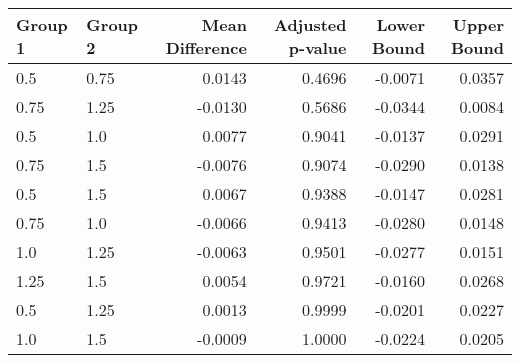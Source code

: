 \begin{tabular}{llrrrr}
\toprule
Group 1 & Group 2 & Mean Difference & Adjusted p-value & Lower Bound & Upper Bound \\
\midrule
0.5 & 0.75 & 0.0143 & 0.4696 & -0.0071 & 0.0357 \\
0.75 & 1.25 & -0.0130 & 0.5686 & -0.0344 & 0.0084 \\
0.5 & 1.0 & 0.0077 & 0.9041 & -0.0137 & 0.0291 \\
0.75 & 1.5 & -0.0076 & 0.9074 & -0.0290 & 0.0138 \\
0.5 & 1.5 & 0.0067 & 0.9388 & -0.0147 & 0.0281 \\
0.75 & 1.0 & -0.0066 & 0.9413 & -0.0280 & 0.0148 \\
1.0 & 1.25 & -0.0063 & 0.9501 & -0.0277 & 0.0151 \\
1.25 & 1.5 & 0.0054 & 0.9721 & -0.0160 & 0.0268 \\
0.5 & 1.25 & 0.0013 & 0.9999 & -0.0201 & 0.0227 \\
1.0 & 1.5 & -0.0009 & 1.0000 & -0.0224 & 0.0205 \\
\bottomrule
\end{tabular}
